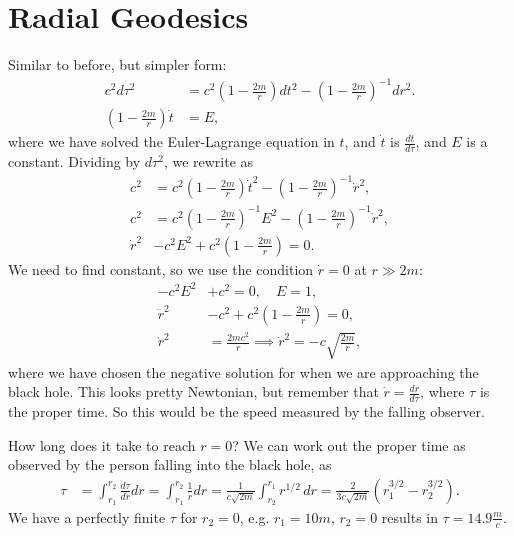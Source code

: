 \documentclass[a4paper, 11pt, normalem]{report}
\begin{document}
\section{Radial Geodesics}
Similar to before, but simpler form:
\begin{align}
    c^2d\tau^2 &= c^2\left(1-\frac{2m}{r}\right)dt^2 - \left(1-\frac{2m}{r}\right)^{-1}dr^2. \\
    \left(1-\frac{2m}{r}\right)\dot{t} &= E,
\end{align}
where we have solved the Euler-Lagrange equation in $t$, and $\dot{t}$ is $\frac{dt}{d\tau}$, and $E$ is a constant.
Dividing by $d\tau^2$, we rewrite as
\begin{align}
    c^2 &= c^2\left(1-\frac{2m}{r}\right)\dot{t}^2 - \left(1-\frac{2m}{r}\right)^{-1}\dot{r}^2, \\
    c^2 &= c^2\left(1-\frac{2m}{r}\right)^{-1}E^2 - \left(1-\frac{2m}{r}\right)^{-1}\dot{r}^2, \\
    \dot{r}^2 &- c^2E^2 + c^2\left(1-\frac{2m}{r}\right) = 0.
\end{align}
We need to find constant, so we use the condition $\dot{r}=0$ at $r\gg2m$:
\begin{align}
    -c^2E^2 &+ c^2 = 0, \quad E = 1, \\
    \dot{r}^2 &- c^2 + c^2\left(1-\frac{2m}{r}\right) = 0, \\
    \dot{r}^2 &= \frac{2mc^2}{r} \implies \dot{r}^2 = -c\sqrt{\frac{2m}{r}},
\end{align}
where we have chosen the negative solution for when we are approaching the black hole. 
This looks pretty Newtonian, but remember that $\dot{r}=\frac{dr}{d\tau}$, where $\tau$ is the proper time. 
So this would be the speed measured by the falling observer.

How long does it take to reach $r=0$?
We can work out the proper time as observed by the person falling into the black hole, as
\begin{align}
    \tau &= \int_{r_1}^{r_2} \frac{d\tau}{dr}dr = \int_{r_1}^{r_2} \frac{1}{\dot{r}}dr = \frac{1}{c\sqrt{2m}}\int_{r_2}^{r_1} r^{1/2}\,dr = \frac{2}{3c\sqrt{2m}}\left(r_1^{3/2} - r_2^{3/2}\right).
\end{align}
We have a perfectly finite $\tau$ for $r_2=0$, e.g. $r_1=10m$, $r_2=0$ results in $\tau=14.9\frac{m}{c}$.
\end{document}
